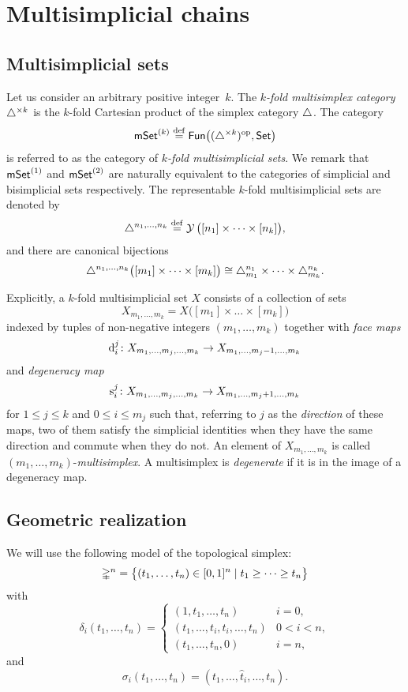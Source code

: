 
\section{Multisimplicial chains} \label{s:multisimplicial chains}

\subsection{Multisimplicial sets} \label{ss:multisimplicial sets}

Let us consider an arbitrary positive integer~$k$.
The \textit{$k$-fold multisimplex category} $\triangle^{\times k}$ is the $k$-fold Cartesian product of the simplex category $\triangle$.
The category
\[
\mathsf{mSet}^{(k)} \stackrel{\mathrm{def}}{=} \mathsf{Fun}\big((\triangle^{\times k})^{\mathrm{op}}, \mathsf{Set}\big)
\]
is referred to as the category of \textit{$k$-fold multisimplicial sets}.
We remark that $\mathsf{mSet}^{(1)}$ and $\mathsf{mSet}^{(2)}$ are naturally equivalent to the categories of simplicial and bisimplicial sets respectively.
The representable $k$-fold multisimplicial sets are denoted by
\[
\triangle^{n_1,\dots,n_k} \stackrel{\mathrm{def}}{=}
\operatorname{\mathcal{Y}} \big([n_1]\times\dots\times[n_k]\big),
\]
and there are canonical bijections
\[
\triangle^{n_1,\dots,n_k} \big([m_1]\times\dots\times[m_k]\big) \cong
\triangle^{n_1}_{m_1}\times\dots\times\triangle^{n_k}_{m_k}.
\]

Explicitly, a $k$-fold multisimplicial set $X$ consists of a collection of sets
\[
X_{m_1,\dots,m_k} =
X \big( [m_1] \times\dots\times [m_k] \big)
\]
indexed by tuples of non-negative integers $(m_1,\dots,m_k)$ together with \textit{face maps}
\[
\operatorname{d}_i^j \colon
X_{m_1, \dots, m_j,\dots,m_k} \to
X_{m_1, \dots, m_j-1, \dots, m_k}
\]
and \textit{degeneracy map}
\[
\operatorname{s}^j_i \colon X_{m_1, \dots, m_j,\dots,m_k} \to X_{m_1, \dots, m_j+1, \dots, m_k}
\]
for $1 \leq j \leq k$ and $0 \leq i \leq m_j$ such that, referring to $j$ as the \textit{direction} of these maps, two of them satisfy the simplicial identities when they have the same direction and commute when they do not.
An element of $X_{m_1,\dots,m_k}$ is called
$(m_1,\dots,m_k)$-\textit{multisimplex}.
A multisimplex is \textit{degenerate} if it is in the image of a degeneracy map.

\subsection{Geometric realization} \label{ss:geometric realization}

We will use the following model of the topological simplex:
\[
\mathbb{\Delta}^n = \big\{
(t_1, \dots, t_n) \in [0,1]^n \mid t_1 \geq \dots \geq t_n
\big\}
\]
with
\[
\delta_i(t_1, \dots, t_n) =
\begin{cases}
	(1, t_1, \dots, t_n) & i = 0, \\
	(t_1, \dots, t_i, t_i, \dots, t_n) & 0 < i < n, \\
	(t_1, \dots, t_n, 0) & i = n,
\end{cases}
\]
and
\[
\sigma_i(t_1, \dots, t_n) = (t_1, \dots, \widehat t_i, \dots, t_n).
\]


